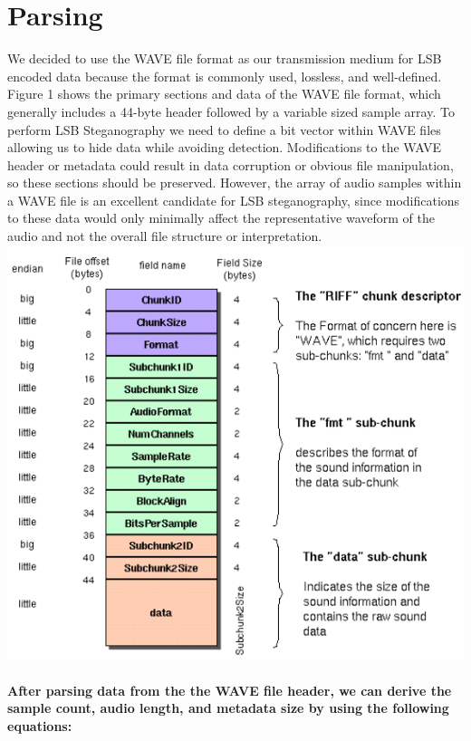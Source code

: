 \section{Parsing}
We decided to use the WAVE file format as our transmission medium for LSB encoded data because the format is commonly used, lossless, and well-defined. Figure 1 shows the primary sections and data of the WAVE file format, which generally includes a 44-byte header followed by a variable sized sample array. To perform LSB Steganography we need to define a bit vector within WAVE files allowing us to hide data while avoiding detection. Modifications to the WAVE header or metadata could result in data corruption or obvious file manipulation, so these sections should be preserved. However, the array of audio samples within a WAVE file is an excellent candidate for LSB steganography, since modifications to these data would only minimally affect the representative waveform of the audio and not the overall file structure or interpretation.
\newline
\noindent
\includegraphics[width=\columnwidth]{images/WaveFormat.png}
\paragraph{{\normalfont After parsing data from the the WAVE file header, we can derive the sample count, audio length, and metadata size by using the following equations:}}

